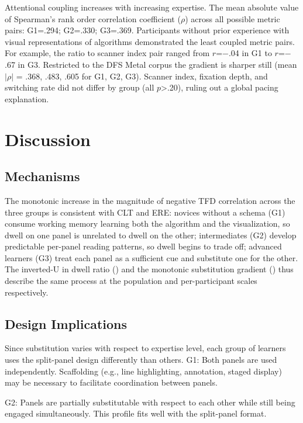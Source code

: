 \documentclass[journal]{vgtc}
\begin{document}
Attentional coupling increases with increasing expertise. The mean
absolute value of Spearman's rank order correlation coefficient
($\rho$) across all possible metric pairs: G1=.294; G2=.330; G3=.369.
Participants without prior experience with visual representations of
algorithms demonstrated the least coupled metric pairs. For example,
the ratio to scanner index pair ranged from $r$=$-$.04 in G1 to
$r$=$-$.67 in G3. Restricted to the DFS Metal corpus the gradient
is sharper still (mean $|\rho|$ = .368, .483, .605 for G1, G2, G3).
Scanner index, fixation depth, and switching rate did not differ by
group (all $p$>.20), ruling out a global pacing explanation.


\section{Discussion}

\subsection{Mechanisms}

The monotonic increase in the magnitude of negative TFD correlation
across the three groups is consistent with CLT and ERE: novices
without a schema (G1) consume working memory learning both the
algorithm and the visualization, so dwell on one panel is unrelated
to dwell on the other; intermediates (G2) develop predictable per-panel
reading patterns, so dwell begins to trade off; advanced learners (G3)
treat each panel as a sufficient cue and substitute one for the other.
The inverted-U in dwell ratio () and the monotonic
substitution gradient () thus describe the same
process at the population and per-participant scales respectively.

\subsection{Design Implications}

Since substitution varies with respect to expertise level, each
group of learners uses the split-panel design differently than
others. G1: Both panels are used independently. Scaffolding (e.g.,
line highlighting, annotation, staged display) may be necessary to
facilitate coordination between panels.

G2: Panels are partially substitutable with respect to each other
while still being engaged simultaneously. This profile fits well
with the split-panel format.
\end{document}
